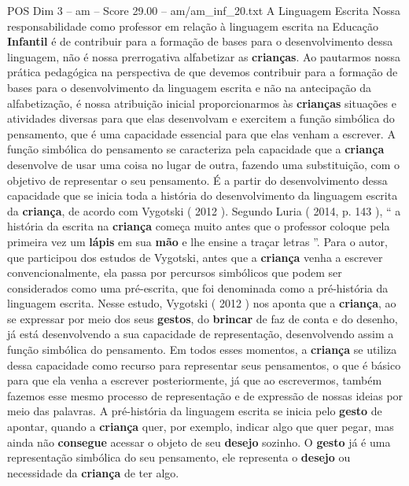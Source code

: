 \begin{textsample}{POS Dim 3 – am – Score 29.00 – am/am\_inf\_20.txt}  \label{ex:f3_pos_037}
A Linguagem Escrita Nossa responsabilidade como professor em relação à linguagem escrita na Educação \textbf{Infantil} é de contribuir para a formação de bases para o desenvolvimento dessa linguagem, não é nossa prerrogativa alfabetizar as \textbf{crianças}.
Ao pautarmos nossa prática pedagógica na perspectiva de que devemos contribuir para a formação de bases para o desenvolvimento da linguagem escrita e não na antecipação da alfabetização, é nossa atribuição inicial proporcionarmos às \textbf{crianças} situações e atividades diversas para que elas desenvolvam e exercitem a função simbólica do pensamento, que é uma capacidade essencial para que elas venham a escrever.
A função simbólica do pensamento se caracteriza pela capacidade que a \textbf{criança} desenvolve de usar uma coisa no lugar de outra, fazendo uma substituição, com o objetivo de representar o seu pensamento.
É a partir do desenvolvimento dessa capacidade que se inicia toda a história do desenvolvimento da linguagem escrita da \textbf{criança}, de acordo com Vygotski ( 2012 ).
Segundo Luria ( 2014, p. 143 ), “ a história da escrita na \textbf{criança} começa muito antes que o professor coloque pela primeira vez um \textbf{lápis} em sua \textbf{mão} e lhe ensine a traçar letras ”.
Para o autor, que participou dos estudos de Vygotski, antes que a \textbf{criança} venha a escrever convencionalmente, ela passa por percursos simbólicos que podem ser considerados como uma pré-escrita, que foi denominada como a pré-história da linguagem escrita.
Nesse estudo, Vygotski ( 2012 ) nos aponta que a \textbf{criança}, ao se expressar por meio dos seus \textbf{gestos}, do \textbf{brincar} de faz de conta e do desenho, já está desenvolvendo a sua capacidade de representação, desenvolvendo assim a função simbólica do pensamento.
Em todos esses momentos, a \textbf{criança} se utiliza dessa capacidade como recurso para representar seus pensamentos, o que é básico para que ela venha a escrever posteriormente, já que ao escrevermos, também fazemos esse mesmo processo de representação e de expressão de nossas ideias por meio das palavras.
A pré-história da linguagem escrita se inicia pelo \textbf{gesto} de apontar, quando a \textbf{criança} quer, por exemplo, indicar algo que quer pegar, mas ainda não \textbf{consegue} acessar o objeto de seu \textbf{desejo} sozinho.
O \textbf{gesto} já é uma representação simbólica do seu pensamento, ele representa o \textbf{desejo} ou necessidade da \textbf{criança} de ter algo.

\end{textsample}
